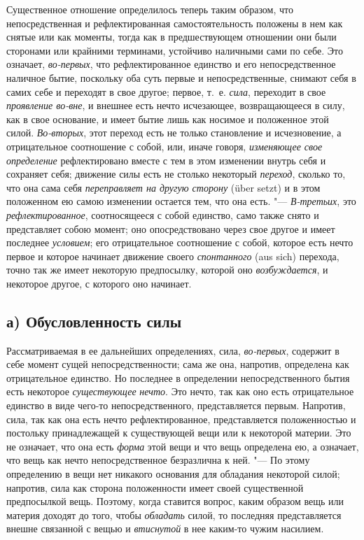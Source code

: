 Существенное отношение определилось теперь таким образом, что
непосредственная и рефлектированная самостоятельность положены в
нем
как снятые или как моменты, тогда как в предшествующем отношении они были
сторонами или крайними терминами, устойчиво наличными сами по себе. Это
означает, {\em во-первых}, что рефлектированное
единство и его непосредственное наличное бытие, поскольку оба суть первые и
непосредственные, снимают себя в самих себе и переходят в свое другое;
первое, т.~е. {\em сила}, переходит в свое
{\em проявление во-вне}, и внешнее есть нечто
исчезающее, возвращающееся в силу, как в свое основание, и имеет бытие лишь
как носимое и положенное этой силой. {\em Во-вторых},
этот переход есть не только становление и исчезновение, а отрицательное
соотношение с собой, или, иначе говоря, {\em изменяющее
свое определение} рефлектировано вместе с тем в этом изменении внутрь себя
и сохраняет себя; движение силы есть не столько некоторый
{\em переход}, сколько то, что она сама себя
{\em переправляет на другую сторону} (über setzt) и в
этом положенном ею самою изменении остается тем, что она есть. "---
{\em В-третьих}, это {\em рефлектированное}, соотносящееся с собой единство,
само также снято и представляет собою момент; оно опосредствовано через
свое другое и имеет последнее {\em условием}; его
отрицательное соотношение с собой, которое есть нечто первое и которое
начинает движение своего {\em спонтанного} (aus sich) перехода,
точно так же имеет некоторую предпосылку, которой оно
{\em возбуждается}, и некоторое другое, с которого оно начинает.


\subsection[а) Обусловленность силы]{а) Обусловленность силы}

Рассматриваемая в ее дальнейших определениях,
сила, {\em во-первых}, содержит в себе момент сущей
непосредственности; сама же она, напротив, определена как отрицательное
единство. Но последнее в определении непосредственного бытия есть некоторое
{\em существующее} {\em нечто}. Это
нечто, так как оно есть отрицательное единство в виде чего-то
непосредственного, представляется первым. Напротив, сила, так как она есть
нечто рефлектированное, представляется положенностью и постольку
принадлежащей к существующей вещи или к некоторой материи. Это не означает,
что она есть {\em форма} этой вещи и что вещь
определена ею, а означает, что вещь как нечто непосредственное безразлична
к ней. "--- По этому определению в вещи нет никакого основания для обладания
некоторой силой; напротив, сила как сторона положенности имеет своей
существенной предпосылкой вещь. Поэтому, когда ставится вопрос, каким
образом вещь или материя доходят до того, чтобы
{\em обладать} силой, то последняя представляется
внешне связанной с вещью и {\em втиснутой} в нее
каким-то чужим насилием.

